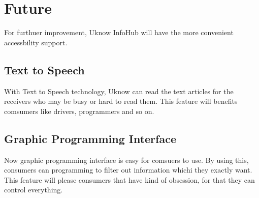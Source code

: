 
\section{Future}
  For furthuer improvement, Uknow InfoHub will have the more convenient accessbility support.
  \subsection{Text to Speech}
    With Text to Speech technology, Uknow can read the text articles for the receivers who may be busy or hard to read them.
    This feature will benefits comsumers like drivers, programmers and so on.
  \subsection{Graphic Programming Interface}
    Now graphic programming interface is easy for comsuers to use.
    By using this, consumers can programming to filter out information whichi they exactly want.
    This feature will please consumers that have kind of obsession, for that they can control everything.

